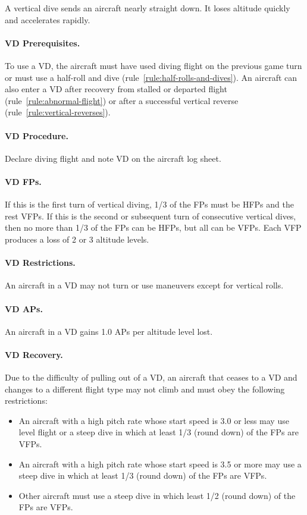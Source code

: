 {A vertical dive sends an aircraft nearly straight down. It loses altitude quickly and accelerates rapidly.

\paragraph{VD Prerequisites.} To use a VD, the aircraft must have used diving flight on the previous game turn or must use a half-roll and dive (rule~\ref{rule:half-rolls-and-dives}). An aircraft can also enter a VD after recovery from stalled or departed flight (rule~\ref{rule:abnormal-flight}) or after a successful vertical reverse (rule~\ref{rule:vertical-reverses}).

\paragraph{VD Procedure.} Declare diving flight and note VD on the aircraft log sheet. 

\paragraph{VD FPs.} If this is the first turn of vertical diving, 1/3 of the FPs must be HFPs and the rest VFPs. If this is the second or subsequent turn of consecutive vertical dives, then no more than 1/3 of the FPs can be HFPs, but all can be VFPs. Each VFP produces a loss of 2 or 3 altitude levels.

\paragraph{VD Restrictions.} An aircraft in a VD may not turn or use maneuvers except for vertical rolls. 

\paragraph{VD APs.} An aircraft in a VD gains 1.0 APs per altitude level lost.

\paragraph{VD Recovery.} Due to the difficulty of pulling out of a VD, an aircraft that ceases to a VD and changes to a different flight type may not climb and must obey the following restrictions:
\begin{itemize}
    \item An aircraft with a high pitch rate whose start speed is 3.0 or less may use level flight or a steep dive in which at least 1/3 (round down) of the FPs are VFPs.
    \item An aircraft with a high pitch rate whose start speed is 3.5 or more may use a steep dive in which at least 1/3 (round down) of the FPs are VFPs.
    \item Other aircraft must use a steep dive in which least 1/2 (round down) of the FPs are VFPs.
\end{itemize}

}

